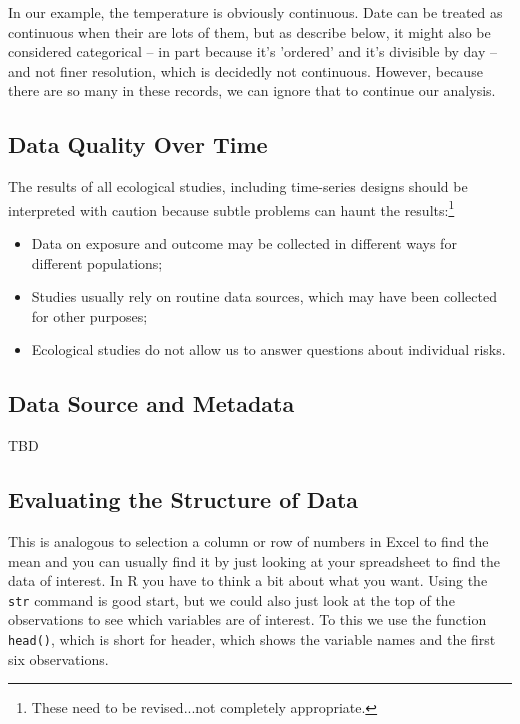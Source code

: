 \documentclass{article}\usepackage[]{graphicx}\usepackage[]{color}
\begin{document}
In our example, the temperature is obviously continuous. Date can be treated as continuous when their are lots of them, but as describe below, it might also be considered categorical -- in part because it's 'ordered' and it's divisible by day -- and not finer resolution, which is decidedly not continuous. However, because there are so many in these records, we can ignore that to continue our analysis. 

\subsection{Data Quality Over Time}

The results of all ecological studies, including time-series designs should be interpreted with caution because subtle problems can haunt the results:\footnote{These need to be revised...not completely appropriate.}

\begin{itemize}
  \item Data on exposure and outcome may be collected in different ways for different populations;
  \item Studies usually rely on routine data sources, which may have been collected for other purposes;
  \item Ecological studies do not allow us to answer questions about individual risks.
\end{itemize}

\subsection{Data Source and Metadata}

TBD

\subsection{Evaluating the Structure of Data}



This is analogous to selection a column or row of numbers in Excel to find the mean and you can usually find it by just looking at your spreadsheet to find the data of interest. In R you have to think a bit about what you want. Using the \texttt{str} command is good start, but we could also just look at the top of the observations to see which variables are of interest. To this we use the function \texttt{head()}, which is short for header, which shows the variable names and the first six observations.
\end{document}

